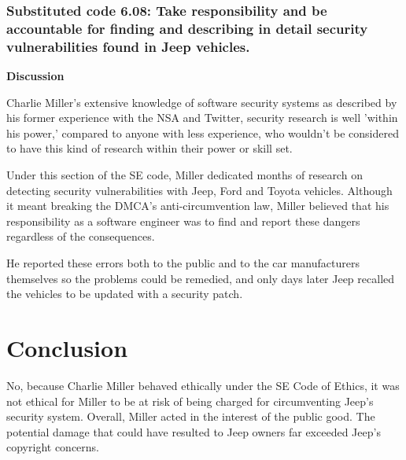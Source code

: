 \documentclass[12pt]{article}
\begin{document}
\begin{multicols}{2}
\subsubsection{Substituted code 6.08: Take responsibility and be accountable for finding and describing in detail security vulnerabilities found in Jeep vehicles.}
\textbf{Discussion}\vspace{.25cm}

Charlie Miller's extensive knowledge of software security systems as described by his former experience with the NSA and Twitter\cite{linkedin}, security research is well 'within his power,' compared to anyone with less experience, who wouldn't be considered to have this kind of research within their power or skill set.

Under this section of the SE code, Miller dedicated months of research on detecting security vulnerabilities with Jeep, Ford and Toyota vehicles.\cite{officialPaper} Although it meant breaking the DMCA's anti-circumvention law, Miller believed that his responsibility as a software engineer was to find and report these dangers regardless of the consequences. 

He reported these errors both to the public and to the car manufacturers themselves so the problems could be remedied, and only days later Jeep recalled the vehicles to be updated with a security patch.\cite{recall}



\section{Conclusion}

No, because Charlie Miller behaved ethically under the SE Code of Ethics, it was not ethical for Miller to be at risk of being charged for circumventing Jeep's security system. Overall, Miller acted in the interest of the public good. The potential damage that could have resulted to Jeep owners far exceeded Jeep's copyright concerns.

\end{multicols}

\nocite{*}



\newpage

\end{document}
